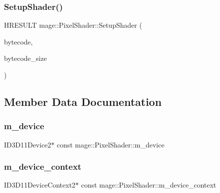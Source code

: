 \hypertarget{classmage_1_1_pixel_shader_a3df5b0c0eee682dad0406409e6df2a11}{}\label{classmage_1_1_pixel_shader_a3df5b0c0eee682dad0406409e6df2a11} 
\subsubsection{\texorpdfstring{Setup\+Shader()}{SetupShader()}\hspace{0.1cm}{\footnotesize\ttfamily [2/2]}}
{\footnotesize\ttfamily H\+R\+E\+S\+U\+LT mage\+::\+Pixel\+Shader\+::\+Setup\+Shader (\begin{DoxyParamCaption}\item[{const void $\ast$}]{bytecode,  }\item[{S\+I\+Z\+E\+\_\+T}]{bytecode\+\_\+size }\end{DoxyParamCaption})\hspace{0.3cm}{\ttfamily [private]}}



\subsection{Member Data Documentation}
\hypertarget{classmage_1_1_pixel_shader_a7fa34f27d8f39db2403edac28ddecc68}{}\label{classmage_1_1_pixel_shader_a7fa34f27d8f39db2403edac28ddecc68} 
\subsubsection{\texorpdfstring{m\+\_\+device}{m\_device}}
{\footnotesize\ttfamily I\+D3\+D11\+Device2$\ast$ const mage\+::\+Pixel\+Shader\+::m\+\_\+device\hspace{0.3cm}{\ttfamily [protected]}}

\hypertarget{classmage_1_1_pixel_shader_a6b9bbf18f255b061fb75453f32a78720}{}\label{classmage_1_1_pixel_shader_a6b9bbf18f255b061fb75453f32a78720} 
\subsubsection{\texorpdfstring{m\+\_\+device\+\_\+context}{m\_device\_context}}
{\footnotesize\ttfamily I\+D3\+D11\+Device\+Context2$\ast$ const mage\+::\+Pixel\+Shader\+::m\+\_\+device\+\_\+context\hspace{0.3cm}{\ttfamily [protected]}}

